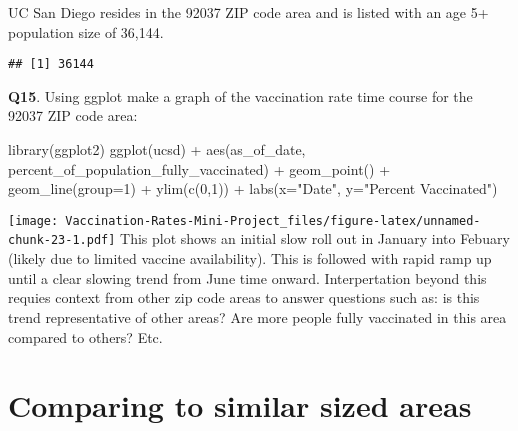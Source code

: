 \documentclass[
]{article}
\newenvironment{Shaded}{\begin{snugshade}}{\end{snugshade}}
\newcommand{\AttributeTok}[1]{\textcolor[rgb]{0.77,0.63,0.00}{#1}}
\newcommand{\DecValTok}[1]{\textcolor[rgb]{0.00,0.00,0.81}{#1}}
\newcommand{\FunctionTok}[1]{\textcolor[rgb]{0.00,0.00,0.00}{#1}}
\newcommand{\NormalTok}[1]{#1}
\newcommand{\OtherTok}[1]{\textcolor[rgb]{0.56,0.35,0.01}{#1}}
\newcommand{\SpecialCharTok}[1]{\textcolor[rgb]{0.00,0.00,0.00}{#1}}
\newcommand{\StringTok}[1]{\textcolor[rgb]{0.31,0.60,0.02}{#1}}
\begin{document}
UC San Diego resides in the 92037 ZIP code area and is listed with an
age 5+ population size of 36,144.

\begin{Shaded}
\end{Shaded}

\begin{verbatim}
## [1] 36144
\end{verbatim}

\textbf{Q15}. Using ggplot make a graph of the vaccination rate time
course for the 92037 ZIP code area:

\begin{Shaded}
\begin{Highlighting}[]
\FunctionTok{library}\NormalTok{(ggplot2)}
\FunctionTok{ggplot}\NormalTok{(ucsd) }\SpecialCharTok{+}
  \FunctionTok{aes}\NormalTok{(as\_of\_date,}
\NormalTok{      percent\_of\_population\_fully\_vaccinated) }\SpecialCharTok{+}
  \FunctionTok{geom\_point}\NormalTok{() }\SpecialCharTok{+}
  \FunctionTok{geom\_line}\NormalTok{(}\AttributeTok{group=}\DecValTok{1}\NormalTok{) }\SpecialCharTok{+}
  \FunctionTok{ylim}\NormalTok{(}\FunctionTok{c}\NormalTok{(}\DecValTok{0}\NormalTok{,}\DecValTok{1}\NormalTok{)) }\SpecialCharTok{+}
  \FunctionTok{labs}\NormalTok{(}\AttributeTok{x=}\StringTok{"Date"}\NormalTok{, }\AttributeTok{y=}\StringTok{"Percent Vaccinated"}\NormalTok{)}
\end{Highlighting}
\end{Shaded}

\texttt{[image: Vaccination-Rates-Mini-Project\_files/figure-latex/unnamed-chunk-23-1.pdf]}
This plot shows an initial slow roll out in January into Febuary (likely
due to limited vaccine availability). This is followed with rapid ramp
up until a clear slowing trend from June time onward. Interpertation
beyond this requies context from other zip code areas to answer
questions such as: is this trend representative of other areas? Are more
people fully vaccinated in this area compared to others? Etc.

\hypertarget{comparing-to-similar-sized-areas}{%
\section{Comparing to similar sized
areas}\label{comparing-to-similar-sized-areas}}
\end{document}
